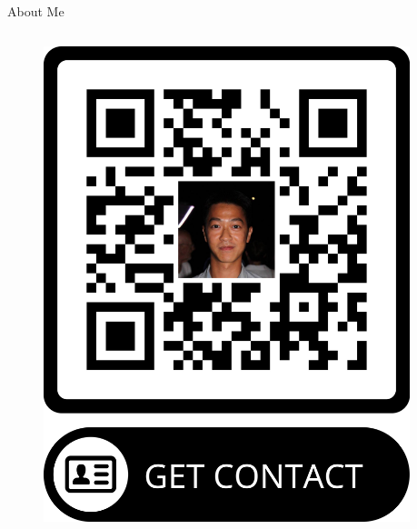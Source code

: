 \documentclass[final,hyperref={pdfpagelabels=false}]{beamer}
\begin{document}
\begin{frame}[t]
\begin{columns}[t]
\begin{column}{.465\textwidth}
\begin{block}{About Me}
\begin{columns}
\begin{column}{.3\textwidth} %
\centering
\begin{figure}
\includegraphics[width=0.95\linewidth]{figures/qr_Karel_Ha.png}
\end{figure}
\end{column}

\end{columns}

\end{block}


\end{column} %

\begin{column}{.015\textwidth}\end{column} %

\end{columns} %

\end{frame} %
\end{document}
